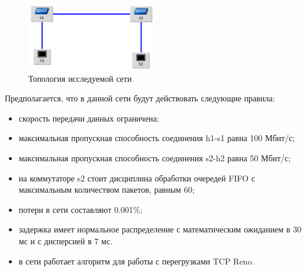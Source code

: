 \begin{figure}[!h]
\centering
\includegraphics[width=0.5\textwidth]{image/example_topo.png}
\caption{Топология исследуемой сети}
\label{fig:30003}
\end{figure}

Предполагается, что в данной сети будут действовать следующие правила:
\begin{itemize}
\item скорость передачи данных ограничена;
\item максимальная пропускная способность соединения h1-s1 равна 100
  Мбит/с;
\item максимальная пропускная способность соединения s2-h2 равна 50
  Мбит/с;
\item на коммутаторе s2 стоит дисциплина обработки очередей FIFO с
  максимальным количеством пакетов, равным 60;
\item потери в сети составляют 0.001\%;
\item задержка имеет нормальное распределение с математическим
  ожиданием в 30 мс и с дисперсией в 7 мс.
\item в сети работает алгоритм для работы с перегрузками TCP Reno.
\end{itemize}

